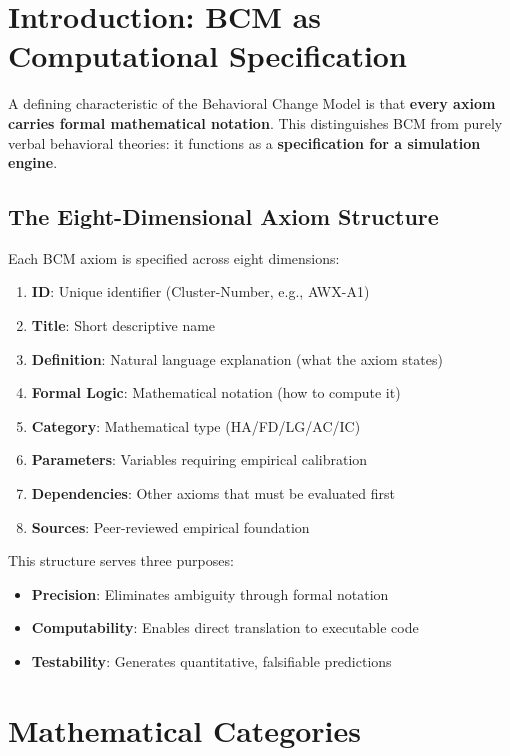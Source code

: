 \section{Introduction: BCM as Computational Specification}

A defining characteristic of the Behavioral Change Model is that \textbf{every axiom carries formal mathematical notation}. This distinguishes BCM from purely verbal behavioral theories: it functions as a \textbf{specification for a simulation engine}.

\subsection{The Eight-Dimensional Axiom Structure}

Each BCM axiom is specified across eight dimensions:

\begin{enumerate}
    \item \textbf{ID}: Unique identifier (Cluster-Number, e.g., AWX-A1)
    \item \textbf{Title}: Short descriptive name
    \item \textbf{Definition}: Natural language explanation (what the axiom states)
    \item \textbf{Formal Logic}: Mathematical notation (how to compute it)
    \item \textbf{Category}: Mathematical type (HA/FD/LG/AC/IC)
    \item \textbf{Parameters}: Variables requiring empirical calibration
    \item \textbf{Dependencies}: Other axioms that must be evaluated first
    \item \textbf{Sources}: Peer-reviewed empirical foundation
\end{enumerate}

This structure serves three purposes:
\begin{itemize}
    \item \textbf{Precision}: Eliminates ambiguity through formal notation
    \item \textbf{Computability}: Enables direct translation to executable code
    \item \textbf{Testability}: Generates quantitative, falsifiable predictions
\end{itemize}

\section{Mathematical Categories}
\label{sec:categories}


